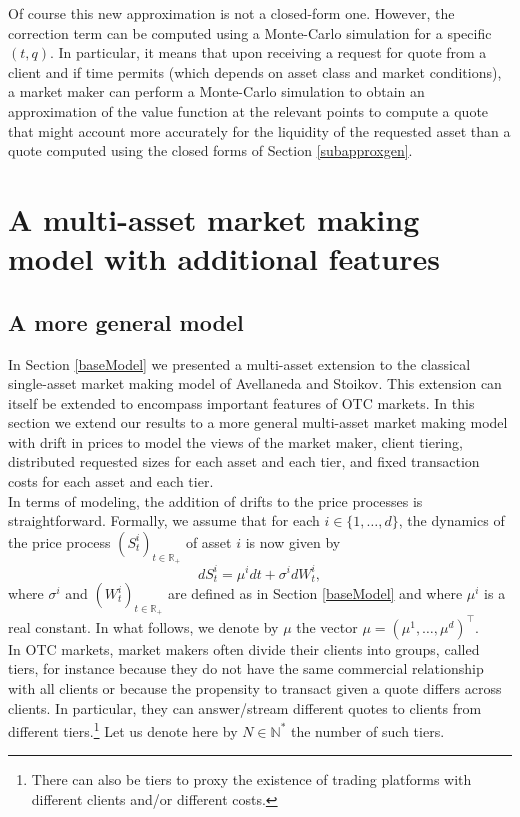 \documentclass[preprint, 3p]{elsarticle}
\newcommand{\1}{{\chi}}
\begin{document}
Of course this new approximation is not a closed-form one. However, the correction term can be computed using a Monte-Carlo simulation for a specific $(t,q)$. In particular, it means that upon receiving a request for quote from a client and if time permits (which depends on asset class and market conditions), a market maker can perform a Monte-Carlo simulation to obtain an approximation of the value function at the relevant points to compute a quote that might account more accurately for the liquidity of the requested asset than a quote computed using the closed forms of Section \ref{subapproxgen}.\\

\section{A multi-asset market making model with additional features} \label{sec:extensions}

\subsection{A more general model}
\vspace{3mm}
In Section \ref{baseModel} we presented a multi-asset extension to the classical single-asset market making model of Avellaneda and Stoikov. This extension can itself be extended to encompass important features of OTC markets. In this section we extend our results to a more general multi-asset market making model with drift in prices to model the views of the market maker, client tiering, distributed requested sizes for each asset and each tier, and fixed transaction costs for each asset and each tier.\\

In terms of modeling, the addition of drifts to the price processes is straightforward. Formally, we assume that for each $i \in \{1,\ldots, d\}$, the dynamics of the price process $(S^i_t)_{ t \in \mathbb R_+}$ of asset $i$ is now given by
$$dS^i_t = \mu^i dt +  \sigma^i dW^i_t,$$
where $\sigma^i$ and $(W^i_t)_{t \in \mathbb R_+}$ are defined as in Section \ref{baseModel} and where $\mu^i$ is a real constant. In what follows, we denote by $\mu$ the vector $\mu = \left(\mu^1, \ldots, \mu^d \right)^\intercal$.\\

In OTC markets, market makers often divide their clients into groups, called tiers, for instance because they do not have the same commercial relationship with all clients or because the propensity to transact given a quote differs across clients. In particular, they can answer/stream different quotes to clients from different tiers.\footnote{There can also be tiers to proxy the existence of trading platforms with different clients and/or different costs.} Let us denote here by $N\in\mathbb N^*$ the number of such tiers.\\
\end{document}
